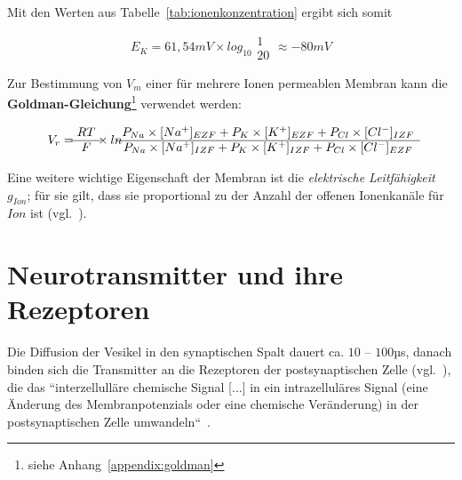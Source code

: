{\noindent
Mit den Werten aus Tabelle~\ref{tab:ionenkonzentration}  ergibt sich somit


\begin{equation}
    E_{K} = 61,54 mV  \times log_{10} \begin{matrix} 1 \\ \hline 20 \end{matrix} \approx -80 mV
    \label{eq:gl-nernst-reduced-end}
\end{equation}

\noindent

Zur Bestimmung von $V_m$ einer für mehrere Ionen permeablen Membran kann die \textbf{Goldman-Gleichung}\footnote{
    siehe Anhang~\ref{appendix:goldman}
} verwendet werden:

\begin{equation}
    V_{r} = \begin{matrix} RT \\ \hline F \end{matrix}  \times ln \begin{matrix}
                                                                      P_{Na} \space  \times \space [Na^+]_{EZF} \space + \space P_{K} \space  \times \space [K^+]_{EZF} \space + \space P_{Cl} \space  \times \space [Cl^-]_{IZF}  \\ \hline
                                                                      P_{Na} \space  \times [Na^+]_{IZF} \space + \space P_{K} \space  \times \space [K^+]_{IZF} \space + \space P_{Cl} \space  \times \space [Cl^-]_{EZF}
    \end{matrix}
    \label{eq:gl-goldman}
\end{equation}

Eine weitere wichtige Eigenschaft der Membran ist die \textit{elektrische Leitfähigkeit} $g_{Ion}$; für sie gilt, dass sie proportional zu der Anzahl der offenen Ionenkanäle für $Ion$ ist (vgl.~\cite[93]{BCP18}).


\section{Neurotransmitter und ihre Rezeptoren}\label{appendix:neurotransmitter}

Die Diffusion der Vesikel in den synaptischen Spalt dauert ca. $10$ – $100$µs, danach binden sich die Transmitter an die Rezeptoren der postsynaptischen Zelle (vgl.~\cite[96]{HS19a}), die das ``interzellulläre chemische Signal [...] in ein intrazelluläres Signal (eine Änderung des Membranpotenzials oder eine chemische Veränderung) in der postsynaptischen Zelle umwandeln``~\cite[123]{BCP18}.

}
